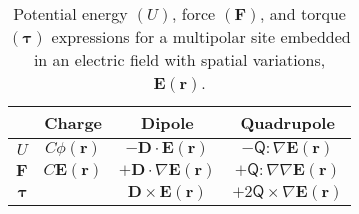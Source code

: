 \begin{table}
\caption{Potential energy $(U)$, force $(\mathbf{F})$, and torque
  $(\mathbf{\tau})$ expressions for a multipolar site embedded in an
  electric field with spatial variations, $\mathbf{E}(\mathbf{r})$.
\label{tab:UFT}}
\centering
\begin{tabular}{r|ccc}
  & Charge & Dipole & Quadrupole \\ \hline
$U$ &  $C \phi(\mathbf{r})$ & $-\mathbf{D} \cdot \mathbf{E}(\mathbf{r})$ & $- \mathsf{Q}:\nabla \mathbf{E}(\mathbf{r})$ \\
$\mathbf{F}$ & $C \mathbf{E}(\mathbf{r})$ & $+\mathbf{D} \cdot \nabla \mathbf{E}(\mathbf{r})$ &  $+\mathsf{Q} : \nabla\nabla\mathbf{E}(\mathbf{r})$ \\
$\mathbf{\tau}$ & & $\mathbf{D} \times \mathbf{E}(\mathbf{r})$ & $+2 \mathsf{Q} \times \nabla \mathbf{E}(\mathbf{r})$
\end{tabular}
\end{table}

\newpage

